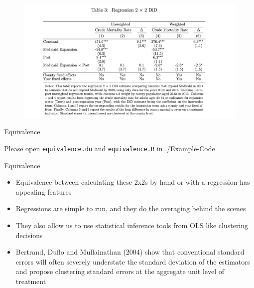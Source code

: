 \documentclass{beamer}
\begin{document}
\begin{frame}

\begin{figure}
    \centering
    \includegraphics[height=0.7\textheight]{./lecture_includes/regression2x2.png}
\end{figure}

\end{frame}

\begin{frame}{Equivalence}

Please open \texttt{equivalence.do} and \texttt{equivalence.R} in ./Example-Code

\end{frame}


\begin{frame}{Equivalence}

\begin{itemize}

\item Equivalence between calculating these 2x2s by hand or with a regression has appealing features
\item Regressions are simple to run, and they do the averaging behind the scenes
\item They also allow us to use statistical inference tools from OLS like clustering decisions
\item  Bertrand, Duflo and Mullainathan (2004) show that conventional standard errors will often severely understate the standard deviation of the estimators and propose clustering standard errors at the aggregate unit level of treatment
\end{itemize}

\end{frame}
\end{document}
